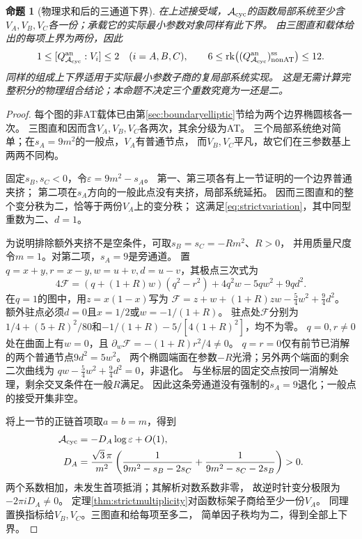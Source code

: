 \documentclass[11pt,a4paper]{ctexart}
\theoremstyle{cnplain}\newtheorem{theorem}{定理}[section]
\newtheorem{proposition}[theorem]{命题}
\theoremstyle{definition}\newtheorem{definition}[theorem]{定义}
\theoremstyle{remark}\newtheorem{remark}[theorem]{注}
\newcommand{\rk}{\operatorname{rk}}\newcommand{\im}{\operatorname{im}}
\begin{document}
\begin{proposition}[物理求和后的三通道下界]\label{prop:cyclicice}
在上述接受域，$\mathcal A_{\rm cyc}$的函数局部系统至少含
$V_A,V_B,V_C$各一份；承载它的实际最小参数对象同样有此下界。
由三图直和载体给出的每项上界为两份，因此
\[
 1\leq[Q_{\mathcal A_{\rm cyc}}^{\rm an}:V_i]\leq2\quad(i=A,B,C),
 \qquad
 6\leq\rk\bigl((Q_{\mathcal A_{\rm cyc}}^{\rm an})_{\rm nonAT}^{\rm ss}\bigr)
      \leq12.
\]
同样的组成上下界适用于实际最小参数子商的复局部系统实现。
这是无需计算完整积分的物理组合结论；本命题不决定三个重数究竟为一还是二。
\end{proposition}
\begin{proof}
每个图的非AT载体已由第\ref{sec:boundaryelliptic}节给为两个边界椭圆核各一次。
三图直和因而含$V_A,V_B,V_C$各两次，其余分级为AT。
三个局部系统绝对简单；在$s_A=9m^2$的一般点，$V_A$有普通节点，
而$V_B,V_C$平凡，故它们在三参数基上两两不同构。

固定$s_B,s_C<0$，令$\varepsilon=9m^2-s_A$。
第一、第三项各有上一节证明的一个边界普通夹挤；
第二项在$s_A$方向的一般此点没有夹挤，局部系统延拓。
因而三图直和的整个变分秩为二，恰等于两份$V_A$上的变分秩；
这满足\eqref{eq:strictvariation}，其中同型重数为二、$d=1$。

为说明排除额外夹挤不是空条件，可取$s_B=s_C=-Rm^2$、$R>0$，
并用质量尺度令$m=1$。对第二项，$s_A=9$是旁通道。
置$q=x+y,r=x-y,w=u+v,d=u-v$，其极点三次式为
\[
 4\mathcal F=(q+(1+R)w)(q^2-r^2)+4q^2w-5qw^2+9qd^2.
\]
在$q=1$的图中，用$z=x(1-x)$写为
$\mathcal F=z+w+(1+R)zw-\frac54w^2+\frac94d^2$。
额外驻点必须$d=0$且$x=1/2$或$w=-1/(1+R)$。
驻点处$\mathcal F$分别为
$1/4+(5+R)^2/80$和$-1/(1+R)-5/[4(1+R)^2]$，均不为零。
$q=0,r\ne0$处在曲面上有$w=0$，且
$\partial_w\mathcal F=-(1+R)r^2/4\ne0$。
$q=r=0$仅有前节已消解的两个普通节点$9d^2=5w^2$。
两个椭圆端面在参数$-R$光滑；另外两个端面的剩余二次曲线为
$qw-\frac54w^2+\frac94d^2=0$，非退化。
与坐标层的固定交点按同一消解处理，剩余交叉条件在一般$R$满足。
因此这条旁通道没有强制的$s_A=9$退化；一般点的接受开集非空。

将上一节的正链首项取$a=b=m$，得到
\begin{align*}
 \mathcal A_{\rm cyc}
   &=-D_A\log\varepsilon+O(1),\\
 D_A&=\frac{\sqrt3\,\pi}{m^2}
       \left(\frac1{9m^2-s_B-2s_C}
             +\frac1{9m^2-s_C-2s_B}\right)>0 .
\end{align*}
两个系数相加，未发生首项抵消；其解析对数系数非零，
故逆时针变分极限为$-2\pi iD_A\ne0$。
定理\ref{thm:strictmultiplicity}对函数标架子商给至少一份$V_A$。
同理置换指标给$V_B,V_C$。三图直和给每项至多二，
简单因子秩均为二，得到全部上下界。
\end{proof}
\end{document}
